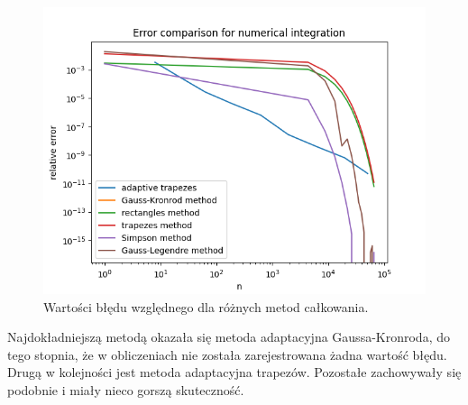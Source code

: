\documentclass[11pt]{scrartcl}
\begin{document}
    \begin{figure}[H]
        \centering
        \includegraphics[width=0.8\linewidth]{integration2_1.png}
        \caption{Wartości błędu względnego dla różnych metod
        całkowania.}
    \end{figure}
    Najdokładniejszą metodą okazała się metoda adaptacyjna
    Gaussa-Kronroda, do tego stopnia, że w obliczeniach nie została
    zarejestrowana żadna wartość błędu. Drugą w kolejności jest metoda
    adaptacyjna trapezów. Pozostałe zachowywały się podobnie i miały
    nieco gorszą skuteczność.
\end{document}
